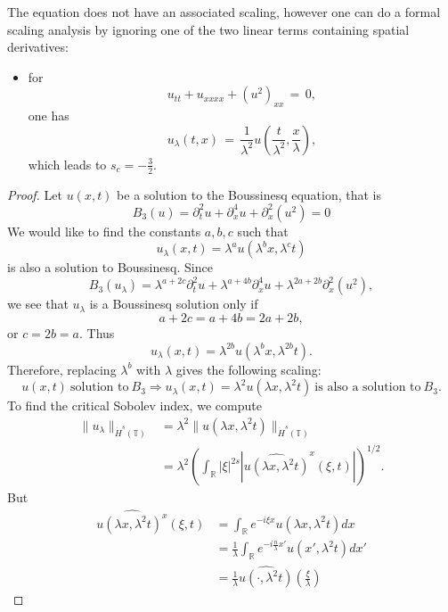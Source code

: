 \documentclass[12pt,reqno]{amsart}
\numberwithin{equation}{section}  %
\newcommand{\rr}{\mathbb{R}}
\newcommand{\ci}{\mathbb{T}}
\newcommand{\wh}{\widehat}
\begin{document}
The equation does not have an associated scaling, however one can do a formal scaling analysis by ignoring one of the two linear terms containing spatial derivatives:
\begin{itemize}
  \item for 
    \[
    u_{tt}+u_{xxxx}+(u^2)_{xx}\,=\,0,
    \]
    one has 
    \[
    u_{\lambda}(t,x)\,=\,\frac{1}{\lambda^2}u\left(\frac{t}{\lambda^2}, \frac{x}{\lambda}\right),
    \]
    which leads to $s_c=-\frac 32$.
\end{itemize}
\begin{proof}
Let $u(x, t)$ be a solution to the Boussinesq equation, that is
%
$$
B_3(u)=
 \partial_t^2u + \partial^4_x u + \partial_x^2(u^2)  = 0
$$
%
We would like to find the constants
$a, b, c$ such that
\[
u_\lambda (x, t) = \lambda^a u(\lambda^b x, \lambda^c t)
\]
is also a solution to Boussinesq.  Since 
$$
B_3(u_\lambda)=
\lambda^{a+2c} \partial_t^2u 
+
 \lambda^{a+4b} \partial^4_x u 
 +
  \lambda^{2a+2b}
  \partial_x^2(u^2),  
$$
we see that $u_\lambda$ is a Boussinesq solution only if
$$
a+2c=a+4b=2a+2b,
$$
or
$
c= 2b =a.
$
  Thus
\[
u_\lambda (x, t) = \lambda^{2b} u(\lambda^{b}x,  \lambda^{2b} t).
\]
%
%
Therefore, replacing  $\lambda^b$ with  $ \lambda$ gives the following scaling:
%
\begin{equation}
\label{DP-scal}
\boxed{u(x, t) \ \text{solution to} \  B_3
 \Longrightarrow 
u_\lambda (x, t) = \lambda^2 u(\lambda x, \lambda^2 t)  \ \text{is also a
solution to} \  B_3.}
\end{equation}
\label{rem:scaling}
To find the critical Sobolev index, we compute
%
%
\begin{equation}
\begin{split}
  \| u_{\lambda} \|_{\dot{H}^s(\ci)} 
  & = \lambda^{2} \| u(\lambda x, \lambda^2 t) \|_{\dot{H}^{s}(\ci)}
  \\
  & = \lambda^{2} \left( \int_{\rr} | \xi |^{2s} | \wh{u (\lambda x,
  \lambda^{2} t)}^x (\xi, t)| \right)^{1/2}.
\end{split}
\label{crit-ind-comp}
\end{equation}
%
But
%
%
\begin{equation*}
\begin{split}
  \wh{u(\lambda x, \lambda^{2}t)^x}(\xi, t)
  & = \int_{\rr}e^{-i\xi x}u(\lambda x, \lambda^2 t) dx
  \\
  & = \frac{1}{\lambda} \int_{\rr}e^{-i \frac{n}{\lambda} x'}u(x',
  \lambda^{2} t) dx'
  \\
  & = \frac{1}{\lambda} \wh{u(\cdot, \lambda^{2}t)}(\frac{\xi}{\lambda})

\end{split}
\end{equation*}
\end{proof}
\end{document}
